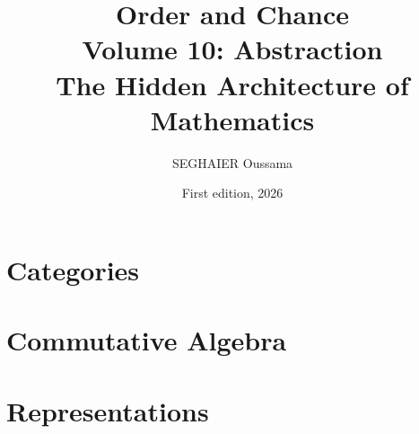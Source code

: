 \documentclass[11pt,openany]{book}
\title{\Huge\textbf{Order and Chance}\\[0.4em]\LARGE Volume 10: Abstraction\\[0.6em]
\Large The Hidden Architecture of Mathematics}
\author{SEGHAIER Oussama}
\date{First edition, 2026}
\begin{document}
\frontmatter
\makecover
\maketitle

\tableofcontents

\mainmatter

\part{Categories}



\part{Commutative Algebra}




\part{Representations}






\end{document}
